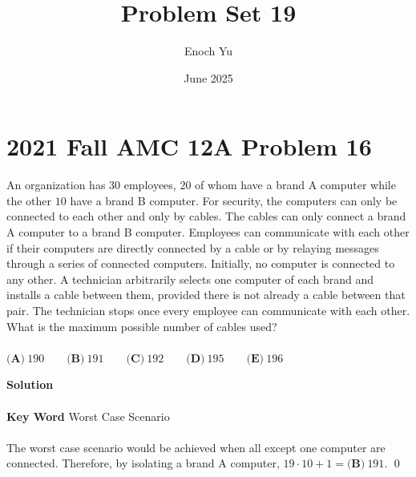 \documentclass{article}
\title{Problem Set 19}
\author{Enoch Yu}
\date{June 2025}
\newenvironment{solution}{\begin{trivlist}\item[]{\bf Solution}}{\qed \end{trivlist}}
\begin{document}
\section*{2021 Fall AMC 12A Problem 16}
An organization has $30$ employees, $20$ of whom have a brand A computer while the other $10$ have a brand B computer. For security, the computers can only be connected to each other and only by cables. The cables can only connect a brand A computer to a brand B computer. Employees can communicate with each other if their computers are directly connected by a cable or by relaying messages through a series of connected computers. Initially, no computer is connected to any other. A technician arbitrarily selects one computer of each brand and installs a cable between them, provided there is not already a cable between that pair. The technician stops once every employee can communicate with each other. What is the maximum possible number of cables used?
\\\\
$\textbf{(A)}\ 190  \qquad\textbf{(B)}\  191 \qquad\textbf{(C)}\  192 \qquad\textbf{(D)}\  195 \qquad\textbf{(E)}\ 196$
\begin{solution}
\\\\
\textbf{Key Word} Worst Case Scenario
\\\\
The worst case scenario would be achieved when all except one computer are connected. Therefore, by isolating a brand A computer, $19 \cdot 10 + 1 = \boxed{\textbf{(B)}\  191}$.
\end{solution}
\end{document}
